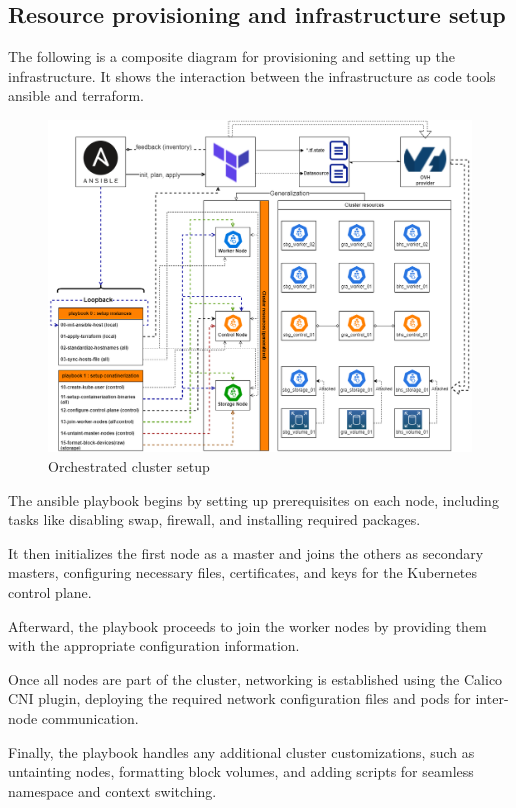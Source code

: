 \subsection{Resource provisioning and infrastructure setup}

The following is a composite diagram for provisioning and setting up the infrastructure. It shows the interaction between the infrastructure as code tools ansible and terraform. 

\begin{figure}[H]\centering
\includegraphics[width=1.0\textwidth,angle=00]{assets/f19.png}
\caption{Orchestrated cluster setup}
\label{fig:Orchestrated cluster setup}
\end{figure}

The ansible playbook begins by setting up prerequisites on each node, including tasks like disabling swap, firewall, and installing required packages.

It then initializes the first node as a master and joins the others as secondary masters, configuring necessary files, certificates, and keys for the Kubernetes control plane.

Afterward, the playbook proceeds to join the worker nodes by providing them with the appropriate configuration information. 

Once all nodes are part of the cluster, networking is established using the Calico CNI plugin, deploying the required network configuration files and pods for inter-node communication. 

Finally, the playbook handles any additional cluster customizations, such as untainting nodes, formatting block volumes, and adding scripts for seamless namespace and context switching.
\newpage
